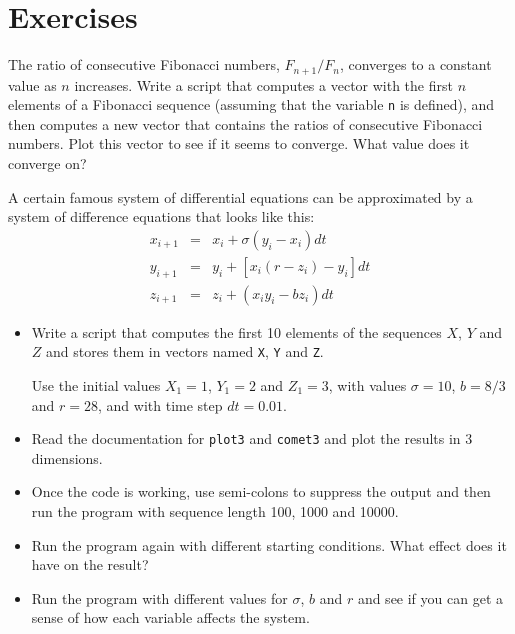\documentclass{book}
\begin{document}
\section{Exercises}

\begin{ex}
\label{fibratio}

The ratio of consecutive Fibonacci numbers, $F_{n+1}/F_{n}$, converges
to a constant value as $n$ increases. Write a script that computes
a vector with the first $n$ elements of a Fibonacci sequence (assuming
that the variable {\tt n} is defined), and then computes a new
vector that contains the ratios of consecutive Fibonacci numbers.
Plot this vector to see if it seems to converge. What value does
it converge on?

\end{ex}

\begin{ex}
A certain famous system of differential equations can be approximated
by a system of difference equations that looks like this:
%
\begin{eqnarray}
x_{i+1} &=& x_i + \sigma \left( y_i - x_i \right) dt \\
y_{i+1} &=& y_i + \left[ x_i (r - z_i) - y_i \right] dt  \\
z_{i+1} &=& z_i + \left( x_i y_i - b z_i \right) dt
\end{eqnarray}
%
\begin{itemize}

\item Write a script that computes the first 10 elements of the sequences
$X$, $Y$ and $Z$ and stores them in vectors named {\tt X}, {\tt Y}
and {\tt Z}.

Use the initial values $X_1 = 1$, $Y_1 = 2$ and $Z_1 = 3$, with values
$\sigma = 10$, $b = 8/3$ and $r = 28$, and with time step $dt = 0.01$.

\item Read the documentation for {\tt plot3} and {\tt comet3} and
plot the results in 3 dimensions.

\item Once the code is working, use semi-colons to suppress the output
and then run the program with sequence length 100, 1000 and 10000.

\item Run the program again with different starting conditions.
What effect does it have on the result?

\item Run the program with different values for $\sigma$, $b$ and $r$
and see if you can get a sense of how each variable affects the
system.

\end{itemize}

\end{ex}
\end{document}

